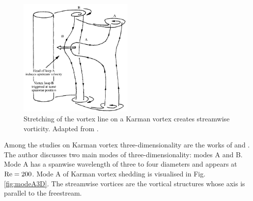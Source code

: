\documentclass[oneside]{utmthesis}
\begin{document}
\begin{figure}[!h]
  \centering
  \hspace{1cm} \includegraphics[width=0.5\textwidth]{figs/modeA}
    \caption{Stretching of the vortex line on a Karman vortex creates streamwise vorticity. Adapted from \citet{Williamson1996a}.}
    \label{fig:modeAStretching}
  \end{figure}

Among the studies on Karman vortex three-dimensionality are the works of \citet{Williamson1996b} and \citet{Williamson1996a}. The author discusses two main modes of three-dimensionality: modes A and B. Mode A has a spanwise wavelength of three to four diameters and appears at $\text{Re} = 200$. Mode A of Karman vortex shedding is visualised in Fig. \ref{fig:modeA3D}. The streamwise vortices are the vortical structures whose axis is parallel to the freestream.
\end{document}
